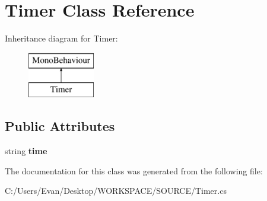 \hypertarget{class_timer}{}\section{Timer Class Reference}
\label{class_timer}
Inheritance diagram for Timer\+:\begin{figure}[H]
\begin{center}
\leavevmode
\includegraphics[height=2.000000cm]{class_timer}
\end{center}
\end{figure}
\subsection*{Public Attributes}
\begin{DoxyCompactItemize}
\item 
\mbox{\label{class_timer_ac38c86aaa687310ce185a2819143429a}} 
string {\bfseries time}
\end{DoxyCompactItemize}


The documentation for this class was generated from the following file\+:\begin{DoxyCompactItemize}
\item 
C\+:/\+Users/\+Evan/\+Desktop/\+W\+O\+R\+K\+S\+P\+A\+C\+E/\+S\+O\+U\+R\+C\+E/Timer.\+cs\end{DoxyCompactItemize}
